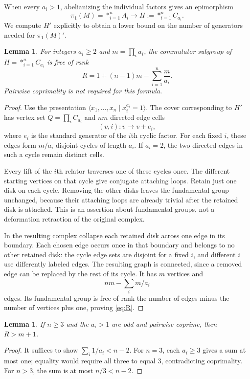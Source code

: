 \documentclass[11pt]{article}
\newtheorem{lemma}[theorem]{Lemma}
\theoremstyle{remark}
\begin{document}
When every $a_i>1$, abelianizing the individual factors gives an epimorphism
\[
 \pi_1(M)=*_{i=1}^n A_i\longrightarrow H:=*_{i=1}^n C_{a_i}.
\]
We compute $H'$ explicitly to obtain a lower bound on the number of generators needed for $\pi_1(M)'$.

\begin{lemma}\label{lem:cyclic-cover}
For integers $a_i\geq2$ and $m=\prod_i a_i$, the commutator subgroup of $H=*_{i=1}^n C_{a_i}$ is free of rank
\begin{equation}\label{eq:R}
 R=1+(n-1)m-\sum_{i=1}^n\frac{m}{a_i}.
\end{equation}
Pairwise coprimality is not required for this formula.
\end{lemma}
\begin{proof}
Use the presentation $\langle x_1,\ldots,x_n\mid x_i^{a_i}=1\rangle$. The cover corresponding to $H'$ has vertex set $Q=\prod_i C_{a_i}$ and $nm$ directed edge cells
\[
 (v,i):v\longrightarrow v+e_i,
\]
where $e_i$ is the standard generator of the $i$th cyclic factor. For each fixed $i$, these edges form $m/a_i$ disjoint cycles of length $a_i$. If $a_i=2$, the two directed edges in such a cycle remain distinct cells.

Every lift of the $i$th relator traverses one of these cycles once. The different starting vertices on that cycle give conjugate attaching loops. Retain just one disk on each cycle. Removing the other disks leaves the fundamental group unchanged, because their attaching loops are already trivial after the retained disk is attached. This is an assertion about fundamental groups, not a deformation retraction of the original complex.


In the resulting complex collapse each retained disk across one edge in its boundary. Each chosen edge occurs once in that boundary and belongs to no other retained disk: the cycle edge sets are disjoint for a fixed $i$, and different $i$ use differently labeled edges. The resulting graph is connected, since a removed edge can be replaced by the rest of its cycle.
It has $m$ vertices and
\[
 nm-\sum_i m/a_i
\]
edges. Its fundamental group is free of rank the number of edges minus the number of vertices plus one, proving \eqref{eq:R}.
\end{proof}

\begin{lemma}\label{lem:odd}
If $n\geq3$ and the $a_i>1$ are odd and pairwise coprime, then $R>m+1$.
\end{lemma}
\begin{proof}
It suffices to show $\sum_i1/a_i<n-2$. For $n=3$, each $a_i\geq3$ gives a sum at most one; equality would require all three to equal $3$, contradicting coprimality. For $n>3$, the sum is at most $n/3<n-2$.
\end{proof}
\end{document}
